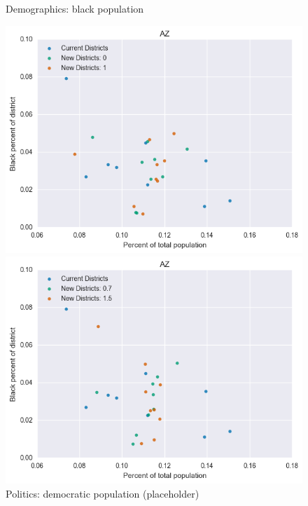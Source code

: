 \begin{figure}[htb!] \centering
\caption{ Demographics: black population }
\includegraphics[width=4.5in]{../analysis/AZ/analysis_scatter.png}
\caption{ Politics: democratic population (placeholder)}
\includegraphics[width=4.5in]{../analysis/AZ/analysis_scatter2.png}
\end{figure}

\clearpage
\newpage

